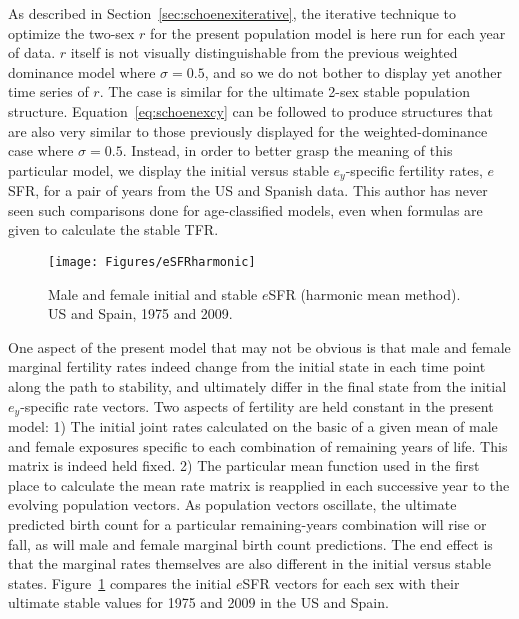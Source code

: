 \FloatBarrier
As described in Section~\ref{sec:schoenexiterative}, the iterative technique to
optimize the two-sex $r$ for the present population model is here run for each year of data. $r$ itself
is not visually distinguishable from the previous weighted dominance model where $\sigma = 0.5$,
and so we do not bother to display yet another time series of $r$. The case is
similar for the ultimate 2-sex stable population structure. Equation~\eqref{eq:schoenexcy} can 
be followed to produce structures that are also very similar to those
previously displayed for the weighted-dominance case where $\sigma =
0.5$. Instead, in order to better grasp the meaning of this particular
model, we display the initial versus stable $e_y$-specific fertility rates,
$e$SFR, for a pair of years from the US and Spanish data. This author has never
seen such comparisons done for age-classified models, even when formulas are given to
calculate the stable TFR. 

\begin{figure}[ht!]
        \centering  
          \caption{Male and female initial and stable $e$SFR (harmonic mean
          method). US and Spain, 1975 and 2009.}
           \texttt{[image: Figures/eSFRharmonic]}
          \label{fig:eSFRharmonic}
\end{figure}

One aspect of the present model that may not be obvious is that male and female marginal
fertility rates indeed change from the initial state in each time point along
the path to stability, and ultimately differ in the final state from the initial
$e_y$-specific rate vectors. Two aspects of fertility are held constant in the
present model: 1) The initial joint rates calculated on the basic of a given
mean of male and female exposures specific to each combination of remaining
years of life. This matrix is indeed held fixed. 2) The particular mean function
used in the first place to calculate the mean rate matrix is reapplied in each
successive year to the evolving population vectors. As population vectors
oscillate, the ultimate predicted birth count for a particular remaining-years
combination will rise or fall, as will male and female marginal birth count
predictions. The end effect is that the marginal rates themselves are also
different in the initial versus stable states. Figure~\ref{fig:eSFRharmonic}
compares the initial $e$SFR vectors for each sex with their ultimate stable
values for 1975 and 2009 in the US and Spain.

